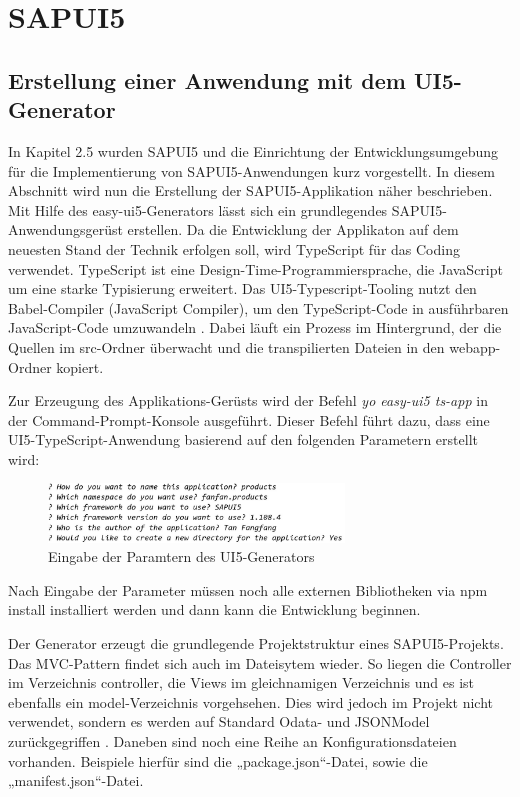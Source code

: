 \section{SAPUI5}
\subsection{Erstellung einer Anwendung mit dem UI5-Generator}
In Kapitel 2.5 wurden SAPUI5 und die Einrichtung der Entwicklungsumgebung für die Implementierung von SAPUI5-Anwendungen kurz vorgestellt. In diesem Abschnitt wird nun die Erstellung der SAPUI5-Applikation näher beschrieben.
Mit Hilfe des easy-ui5-Generators lässt sich ein grundlegendes SAPUI5-Anwendungsgerüst erstellen. Da die Entwicklung der Applikaton auf dem neuesten Stand der Technik erfolgen soll, wird TypeScript für das Coding verwendet. TypeScript ist eine Design-Time-Programmiersprache, die JavaScript um eine starke Typisierung erweitert. Das UI5-Typescript-Tooling nutzt den Babel-Compiler (JavaScript Compiler), um den TypeScript-Code in ausführbaren JavaScript-Code umzuwandeln \cite{pm:gswt}. Dabei läuft ein Prozess im Hintergrund, der die Quellen im src-Ordner überwacht und die transpilierten Dateien in den webapp-Ordner kopiert. 

Zur Erzeugung des Applikations-Gerüsts wird der Befehl \textit{yo easy-ui5 ts-app} in der Command-Prompt-Konsole ausgeführt. Dieser Befehl führt dazu, dass eine UI5-TypeScript-Anwendung basierend auf den folgenden Parametern erstellt wird:

\begin{figure}[htbp]
 \centering
 \includegraphics[width=0.7\textwidth]{Bilder/ui5 freestyle/ui5generator_parameter.jpg}
 \caption{Eingabe der Paramtern des UI5-Generators}
\end{figure}

Nach Eingabe der Parameter müssen noch alle externen Bibliotheken via npm install installiert werden und dann kann die Entwicklung beginnen.

Der Generator erzeugt die grundlegende Projektstruktur eines SAPUI5-Projekts. Das MVC-Pattern findet sich auch im Dateisytem wieder. So liegen die Controller im Verzeichnis controller, die Views im gleichnamigen Verzeichnis und es ist ebenfalls ein model-Verzeichnis vorgehsehen. Dies wird jedoch im Projekt nicht verwendet, sondern es werden auf Standard Odata- und JSONModel zurückgegriffen \cite{sud:ao}. Daneben sind noch eine Reihe an Konfigurationsdateien vorhanden. Beispiele hierfür sind die „package.json“-Datei, sowie die „manifest.json“-Datei. 

